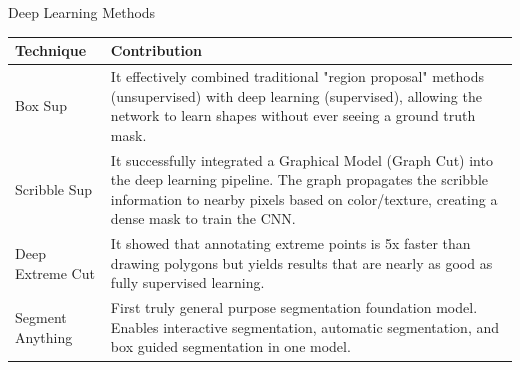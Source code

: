\documentclass[11pt, aspectratio=169]{beamer}
\begin{document}
\begin{frame}{Deep Learning Methods} %
	\begin{table}[h]
		\centering
		\begin{tabular}{|l|p{10cm}|}
			\hline
			\textbf{Technique} & \textbf{Contribution} \\ \hline
			
			Box Sup
			& It effectively combined traditional "region proposal" methods (unsupervised) with deep learning (supervised), allowing the network to learn shapes without ever seeing a ground truth mask. \\ \hline
			
			Scribble Sup
			& It successfully integrated a Graphical Model (Graph Cut) into the deep learning pipeline. The graph propagates the scribble information to nearby pixels based on color/texture, creating a dense mask to train the CNN. \\ \hline
			
			Deep Extreme Cut
			& It showed that annotating extreme points is 5x faster than drawing polygons but yields results that are nearly as good as fully supervised learning. \\ \hline
			
			Segment Anything
			& First truly general purpose segmentation foundation model. Enables interactive segmentation, automatic segmentation, and box guided segmentation in one model. \\ \hline
			
		\end{tabular}
	\end{table}
\end{frame}
\end{document}
